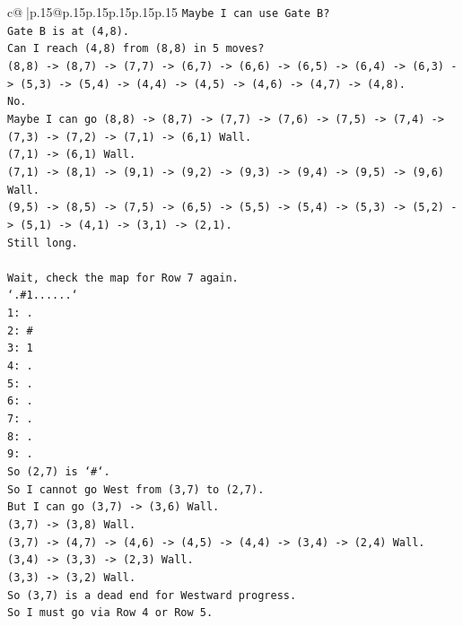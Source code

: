 \documentclass{article}
\begin{document}
{\begin{supertabular}{c@{$\;$}|p{.15\linewidth}@{}p{.15\linewidth}p{.15\linewidth}p{.15\linewidth}p{.15\linewidth}p{.15\linewidth}}
{{{\texttt{Maybe I can use Gate B?} \\
\texttt{Gate B is at (4,8).} \\
\texttt{Can I reach (4,8) from (8,8) in 5 moves?} \\
\texttt{(8,8) {-}> (8,7) {-}> (7,7) {-}> (6,7) {-}> (6,6) {-}> (6,5) {-}> (6,4) {-}> (6,3) {-}> (5,3) {-}> (5,4) {-}> (4,4) {-}> (4,5) {-}> (4,6) {-}> (4,7) {-}> (4,8).} \\
\texttt{No.} \\
\texttt{Maybe I can go (8,8) {-}> (8,7) {-}> (7,7) {-}> (7,6) {-}> (7,5) {-}> (7,4) {-}> (7,3) {-}> (7,2) {-}> (7,1) {-}> (6,1) Wall.} \\
\texttt{(7,1) {-}> (6,1) Wall.} \\
\texttt{(7,1) {-}> (8,1) {-}> (9,1) {-}> (9,2) {-}> (9,3) {-}> (9,4) {-}> (9,5) {-}> (9,6) Wall.} \\
\texttt{(9,5) {-}> (8,5) {-}> (7,5) {-}> (6,5) {-}> (5,5) {-}> (5,4) {-}> (5,3) {-}> (5,2) {-}> (5,1) {-}> (4,1) {-}> (3,1) {-}> (2,1).} \\
\texttt{Still long.} \\
\\ 
\texttt{Wait, check the map for Row 7 again.} \\
\texttt{`.\#1......`} \\
\texttt{1: .} \\
\texttt{2: \#} \\
\texttt{3: 1} \\
\texttt{4: .} \\
\texttt{5: .} \\
\texttt{6: .} \\
\texttt{7: .} \\
\texttt{8: .} \\
\texttt{9: .} \\
\texttt{So (2,7) is `\#`.} \\
\texttt{So I cannot go West from (3,7) to (2,7).} \\
\texttt{But I can go (3,7) {-}> (3,6) Wall.} \\
\texttt{(3,7) {-}> (3,8) Wall.} \\
\texttt{(3,7) {-}> (4,7) {-}> (4,6) {-}> (4,5) {-}> (4,4) {-}> (3,4) {-}> (2,4) Wall.} \\
\texttt{(3,4) {-}> (3,3) {-}> (2,3) Wall.} \\
\texttt{(3,3) {-}> (3,2) Wall.} \\
\texttt{So (3,7) is a dead end for Westward progress.} \\
\texttt{So I must go via Row 4 or Row 5.} \\
}}}
\end{supertabular}}
\end{document}
